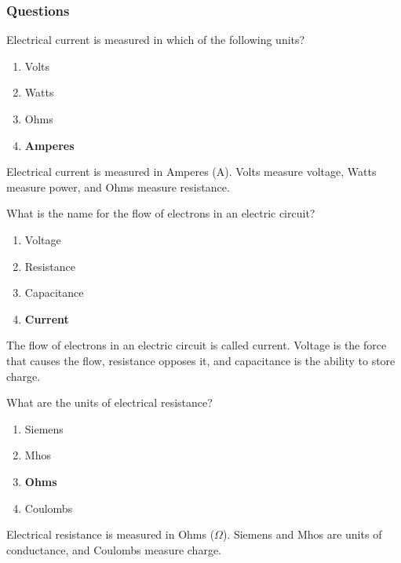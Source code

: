\subsubsection*{Questions}

\begin{tcolorbox}[colback=gray!10!white,colframe=black!75!black,title={T5A01}]
    Electrical current is measured in which of the following units?
    \begin{enumerate}[label=\Alph*),noitemsep]
        \item Volts
        \item Watts
        \item Ohms
        \item \textbf{Amperes}
    \end{enumerate}
\end{tcolorbox}
Electrical current is measured in Amperes (A). Volts measure voltage, Watts measure power, and Ohms measure resistance.

\begin{tcolorbox}[colback=gray!10!white,colframe=black!75!black,title={T5A03}]
    What is the name for the flow of electrons in an electric circuit?
    \begin{enumerate}[label=\Alph*),noitemsep]
        \item Voltage
        \item Resistance
        \item Capacitance
        \item \textbf{Current}
    \end{enumerate}
\end{tcolorbox}
The flow of electrons in an electric circuit is called current. Voltage is the force that causes the flow, resistance opposes it, and capacitance is the ability to store charge.

\begin{tcolorbox}[colback=gray!10!white,colframe=black!75!black,title={T5A04}]
    What are the units of electrical resistance?
    \begin{enumerate}[label=\Alph*),noitemsep]
        \item Siemens
        \item Mhos
        \item \textbf{Ohms}
        \item Coulombs
    \end{enumerate}
\end{tcolorbox}
Electrical resistance is measured in Ohms (\(\Omega\)). Siemens and Mhos are units of conductance, and Coulombs measure charge.

